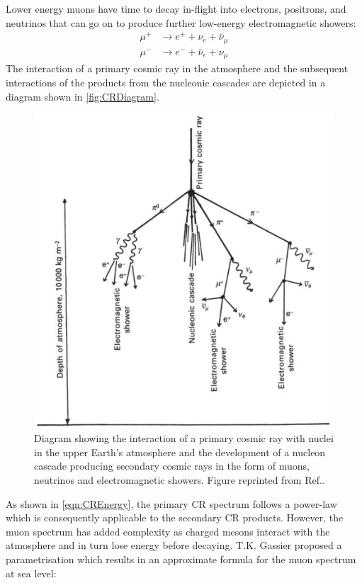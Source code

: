 Lower energy muons have time to decay in-flight into electrons, positrons, and neutrinos that can go on to produce further low-energy electromagnetic showers:
\begin{equation}
\begin{split}    
    \mu^+&\rightarrow e^++\nu_e+\bar\nu_\mu \\
    \mu^-&\rightarrow e^-+\bar\nu_e+\nu_\mu
\end{split}
\end{equation}
The interaction of a primary cosmic ray in the atmosphere and the subsequent interactions of the products from the nucleonic cascades are depicted in a diagram shown in \autoref{fig:CRDiagram}.
\begin{figure}[ht!]
    \centering
    \includegraphics[width=0.8\linewidth]{figures/Muons/MuonShower.png}
    \caption{Diagram showing the interaction of a primary cosmic ray with nuclei in the upper Earth's atmosphere and the development of a nucleon cascade producing secondary cosmic rays in the form of muons, neutrinos and electromagnetic showers. Figure reprinted from Ref.\cite{Longair_2011}.}
    \label{fig:CRDiagram}
\end{figure}
As shown in \autoref{eqn:CREnergy}, the primary CR spectrum follows a power-law which is consequently applicable to the secondary CR products. However, the muon spectrum has added complexity as charged mesons interact with the atmosphere and in turn lose energy before decaying. T.K. Gassier proposed a parametrisation \cite{Gaisser_Engel_Resconi_2016} which results in an approximate formula for the muon spectrum at sea level:
